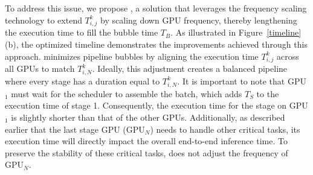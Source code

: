 



To address this issue, we propose \thisproj{}, a solution that leverages the frequency scaling technology to extend $T_{i,j}^{k}$ by scaling down GPU frequency, thereby lengthening the execution time to fill the bubble time $T_B$. 
As illustrated in Figure~\ref{timeline}(b), the optimized timeline demonstrates the improvements achieved through this approach. \thisproj{} minimizes pipeline bubbles by aligning the execution time $T_{i,j}^{k}$ across all GPUs to match $T_{i,N}^{k}$. 
Ideally, this adjustment creates a balanced pipeline where every stage has a duration equal to $T_{i,N}^{k}$.
It is important to note that GPU$_1$ must wait for the scheduler to assemble the batch, which adds $T_S$ to the execution time of stage 1.
Consequently, the execution time for the stage on GPU$_1$ is slightly shorter than that of the other GPUs. 
Additionally, as described earlier that the last stage GPU (GPU$_N$) needs to handle other critical tasks, its execution time will directly impact the overall end-to-end inference time. 
To preserve the stability of these critical tasks, \thisproj{} does not adjust the frequency of GPU$_N$.

